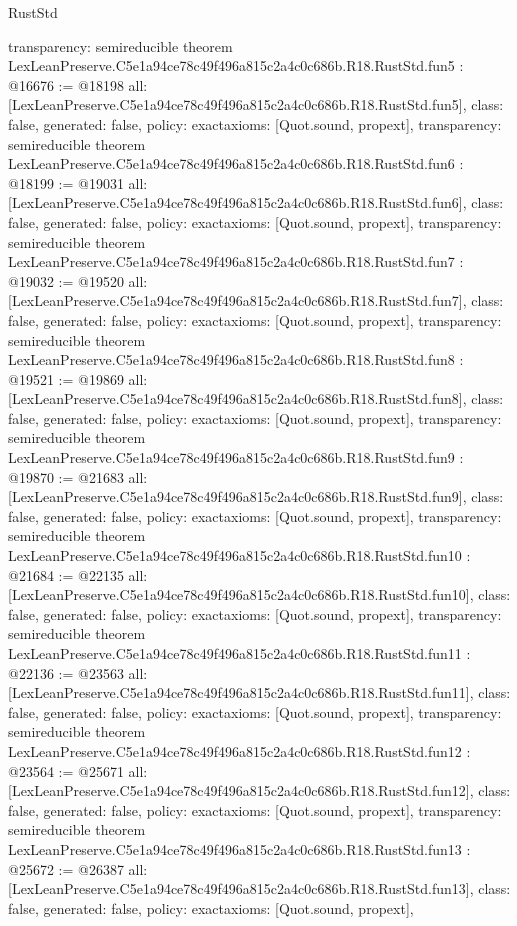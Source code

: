 \begin{lexlean}{RustStd}
\begin{coremodule}
{  transparency: semireducible
}
theorem LexLeanPreserve.C5e1a94ce78c49f496a815c2a4c0c686b.R18.RustStd.fun5 : @16676 := @18198 {
  all: [LexLeanPreserve.C5e1a94ce78c49f496a815c2a4c0c686b.R18.RustStd.fun5],
  class: false,
  generated: false,
  policy: exact{axioms: [Quot.sound, propext]},
  transparency: semireducible
}
theorem LexLeanPreserve.C5e1a94ce78c49f496a815c2a4c0c686b.R18.RustStd.fun6 : @18199 := @19031 {
  all: [LexLeanPreserve.C5e1a94ce78c49f496a815c2a4c0c686b.R18.RustStd.fun6],
  class: false,
  generated: false,
  policy: exact{axioms: [Quot.sound, propext]},
  transparency: semireducible
}
theorem LexLeanPreserve.C5e1a94ce78c49f496a815c2a4c0c686b.R18.RustStd.fun7 : @19032 := @19520 {
  all: [LexLeanPreserve.C5e1a94ce78c49f496a815c2a4c0c686b.R18.RustStd.fun7],
  class: false,
  generated: false,
  policy: exact{axioms: [Quot.sound, propext]},
  transparency: semireducible
}
theorem LexLeanPreserve.C5e1a94ce78c49f496a815c2a4c0c686b.R18.RustStd.fun8 : @19521 := @19869 {
  all: [LexLeanPreserve.C5e1a94ce78c49f496a815c2a4c0c686b.R18.RustStd.fun8],
  class: false,
  generated: false,
  policy: exact{axioms: [Quot.sound, propext]},
  transparency: semireducible
}
theorem LexLeanPreserve.C5e1a94ce78c49f496a815c2a4c0c686b.R18.RustStd.fun9 : @19870 := @21683 {
  all: [LexLeanPreserve.C5e1a94ce78c49f496a815c2a4c0c686b.R18.RustStd.fun9],
  class: false,
  generated: false,
  policy: exact{axioms: [Quot.sound, propext]},
  transparency: semireducible
}
theorem LexLeanPreserve.C5e1a94ce78c49f496a815c2a4c0c686b.R18.RustStd.fun10 : @21684 := @22135 {
  all: [LexLeanPreserve.C5e1a94ce78c49f496a815c2a4c0c686b.R18.RustStd.fun10],
  class: false,
  generated: false,
  policy: exact{axioms: [Quot.sound, propext]},
  transparency: semireducible
}
theorem LexLeanPreserve.C5e1a94ce78c49f496a815c2a4c0c686b.R18.RustStd.fun11 : @22136 := @23563 {
  all: [LexLeanPreserve.C5e1a94ce78c49f496a815c2a4c0c686b.R18.RustStd.fun11],
  class: false,
  generated: false,
  policy: exact{axioms: [Quot.sound, propext]},
  transparency: semireducible
}
theorem LexLeanPreserve.C5e1a94ce78c49f496a815c2a4c0c686b.R18.RustStd.fun12 : @23564 := @25671 {
  all: [LexLeanPreserve.C5e1a94ce78c49f496a815c2a4c0c686b.R18.RustStd.fun12],
  class: false,
  generated: false,
  policy: exact{axioms: [Quot.sound, propext]},
  transparency: semireducible
}
theorem LexLeanPreserve.C5e1a94ce78c49f496a815c2a4c0c686b.R18.RustStd.fun13 : @25672 := @26387 {
  all: [LexLeanPreserve.C5e1a94ce78c49f496a815c2a4c0c686b.R18.RustStd.fun13],
  class: false,
  generated: false,
  policy: exact{axioms: [Quot.sound, propext]},
}
\end{coremodule}
\end{lexlean}
